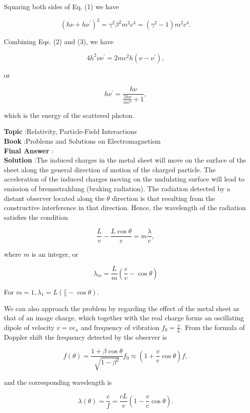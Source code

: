 \documentclass[10pt]{article}
\begin{document}
Squaring both sides of Eq.
(1) we have

$$
\left(h \nu+h \nu^{\prime}\right)^{2}=\gamma^{2} \beta^{2} m^{2} c^{4}=\left(\gamma^{2}-1\right) m^{2} c^{4} .
$$

Combining Eqs.
(2) and (3), we have

$$
4 h^{2} \nu \nu^{\prime}=2 m c^{2} h\left(\nu-\nu^{\prime}\right),
$$

or

$$
h \nu^{\prime}=\frac{h \nu}{\frac{2 h \nu}{m c^{2}}+1},
$$

which is the energy of the scattered photon.


\textbf{Topic} :Relativity, Particle-Field Interactions\\
\textbf{Book} :Problems and Solutions on Electromagnetism\\
\textbf{Final Answer} :\\


\textbf{Solution} :The induced charges in the metal sheet will move on the surface of the sheet along the general direction of motion of the charged particle. The acceleration of the induced charges moving on the undulating surface will lead to emission of bremsstrahlung (braking radiation). The radiation detected by a distant observer located along the $\theta$ direction is that resulting from the constructive interference in that direction. Hence, the wavelength of the radiation satisfies the condition

$$
\frac{L}{v}-\frac{L \cos \theta}{c}=m \frac{\lambda}{c},
$$

where $m$ is an integer, or

$$
\lambda_{m}=\frac{L}{m}\left(\frac{c}{v}-\cos \theta\right)
$$

For $m=1, \lambda_{1}=L\left(\frac{c}{v}-\cos \theta\right)$.

We can also approach the problem by regarding the effect of the metal sheet as that of an image charge, which together with the real charge forms an oscillating dipole of velocity $v=v e_{x}$ and frequency of vibration $f_{0}=\frac{v}{L}$. From the formula of Doppler shift the frequency detected by the observer is

$$
f(\theta)=\frac{1+\beta \cos \theta}{\sqrt{1-\beta^{2}}} f_{0} \approx\left(1+\frac{v}{c} \cos \theta\right) f,
$$

and the corresponding wavelength is

$$
\lambda(\theta)=\frac{c}{f}=\frac{c L}{v}\left(1-\frac{v}{c} \cos \theta\right) .
$$
\end{document}
